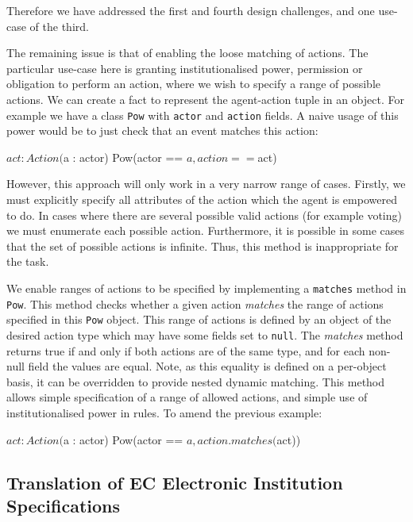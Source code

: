 Therefore we have addressed the first and fourth design challenges, and one use-case
of the third. 

The remaining issue is that of enabling the loose matching of
actions. The particular use-case here is granting institutionalised power,
permission or obligation to perform an action, where we wish to specify a range
of possible actions. We can create a fact to represent the agent-action tuple in
an object. For example we have a class \texttt{Pow} with \texttt{actor} and
\texttt{action} fields. A naive usage of this power would be to just check that
an event matches this action:

\begin{droolsinline}
$act : Action($a : actor)
Pow(actor == $a, action == $act)
\end{droolsinline}

However, this approach will only work in a very narrow range of cases.
Firstly, we must explicitly specify all attributes of the action which the
agent is empowered to do. In cases where there are several possible valid
actions (for example voting) we must enumerate each possible action.
Furthermore, it is possible in some cases that the set of possible actions is
infinite. Thus, this method is inappropriate for the task.

We enable ranges of actions to be specified by implementing a \texttt{matches}
method in \texttt{Pow}. This method checks whether a given action \emph{matches}
the range of actions specified in this \texttt{Pow} object. This range of
actions is defined by an object of the desired action type which may have some
fields set to \texttt{null}. The \emph{matches} method returns true if and only
if both actions are of the same type, and for each non-null field the values are
equal. Note, as this equality is defined on a per-object basis, it can be
overridden to provide nested dynamic matching. This method allows simple
specification of a range of allowed actions, and simple use of institutionalised
power in rules. To amend the previous example:

\begin{droolsinline}
$act : Action($a : actor)
Pow(actor == $a, action.matches($act))
\end{droolsinline}

\subsection{Translation of EC Electronic Institution Specifications}

